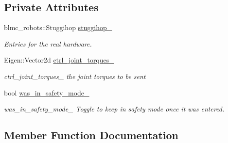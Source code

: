 \subsection*{Private Attributes}
\begin{DoxyCompactItemize}
\item 
blmc\+\_\+robots\+::\+Stuggihop \hyperlink{classdg__blmc__robots_1_1DGMStuggihop_a70126fb0319274141ab4a6193e7c7121}{stuggihop\+\_\+}
\begin{DoxyCompactList}\small\item\em Entries for the real hardware. \end{DoxyCompactList}\item 
Eigen\+::\+Vector2d \hyperlink{classdg__blmc__robots_1_1DGMStuggihop_afb2035bb08deca1f64ec1284dcf8dfff}{ctrl\+\_\+joint\+\_\+torques\+\_\+}\hypertarget{classdg__blmc__robots_1_1DGMStuggihop_afb2035bb08deca1f64ec1284dcf8dfff}{}\label{classdg__blmc__robots_1_1DGMStuggihop_afb2035bb08deca1f64ec1284dcf8dfff}

\begin{DoxyCompactList}\small\item\em ctrl\+\_\+joint\+\_\+torques\+\_\+ the joint torques to be sent \end{DoxyCompactList}\item 
bool \hyperlink{classdg__blmc__robots_1_1DGMStuggihop_ac2491e5f7993fc8d1bcbc7af4da69f86}{was\+\_\+in\+\_\+safety\+\_\+mode\+\_\+}\hypertarget{classdg__blmc__robots_1_1DGMStuggihop_ac2491e5f7993fc8d1bcbc7af4da69f86}{}\label{classdg__blmc__robots_1_1DGMStuggihop_ac2491e5f7993fc8d1bcbc7af4da69f86}

\begin{DoxyCompactList}\small\item\em was\+\_\+in\+\_\+safety\+\_\+mode\+\_\+ Toggle to keep in safety mode once it was entered. \end{DoxyCompactList}\end{DoxyCompactItemize}


\subsection{Member Function Documentation}
